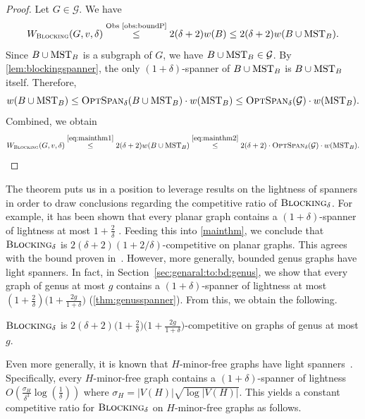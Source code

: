 \documentclass[a4paper,cleveref, autoref, thm-restate, thm-restate, UKenglish]{lipics-v2021}
\newcommand{\blocking}{\textsc{Blocking}}
\newcommand{\optspan}{\textsc{OptSpan}_\delta}
\newcommand{\cost}{W_{\blocking}}
\begin{document}
\begin{proof}
Let $G \in \mathcal{G}$. We have
\begin{equation}\label{eq:mainthm1}
\cost(G,v, \delta) \overset{\text{Obs \ref{obs:boundP}}}{\leq} 2(\delta+2) w(B)
\leq 2(\delta+2) w(B \cup \mstb).
\end{equation}
Since $B \cup \mathrm{MST}_B$ is a subgraph of $G$, we have $B \cup \mathrm{MST}_B \in \mathcal{G}$. By \cref{lem:blockingspanner}, the only $(1+\delta)$-spanner of $B\cup \mathrm{MST}_B$ is $B\cup \mathrm{MST}_B$ itself. Therefore, 
\begin{equation}\label{eq:mainthm2}
 w(B \cup \mstb) \leq  \optspan (B\cup \mstb) \cdot w(\mstb) \leq  \optspan (\mathcal{G}) \cdot w(\mstb).
 \end{equation} 
Combined, we obtain
\begin{equation*}
\cost(G,v, \delta) \overset{\eqref{eq:mainthm1}}{\leq} 2(\delta+2) w(B \cup \mstb) \overset{\eqref{eq:mainthm2}}{\leq} 2(\delta+2) \cdot \optspan (\mathcal{G}) \cdot w(\mstb). \qedhere
\end{equation*} 
\end{proof}

The theorem puts us in a position to leverage results on the lightness of spanners in order to draw conclusions regarding the competitive ratio of $\blocking_\delta$. 
For example, it has been shown that 
every planar graph contains a $(1+\delta)$-spanner of lightness at most $1+\frac{2}{\delta}$ \cite{althoefer}. 
Feeding this into \cref{mainthm}, we conclude that $\blocking_\delta$ is $2(\delta+2)(1+2/\delta)$-competitive on planar graphs. 
This agrees with the bound proven in~\cite{pruhs94}.
However, more generally, bounded genus graphs have light spanners. In fact, in Section~\ref{sec:genaral:to:bd:genus}, we show that every graph of genus at most $g$ contains a $(1+\delta)$-spanner of lightness at most $\left(1+\frac{2}{\delta} \right) \bigl( 1 + \frac{2g}{1+\delta}\bigl)$ (\cref{thm:genusspanner}). From this, we obtain the following.


\begin{corollary}\label{cor:blocking:delta:genus}
$\blocking_\delta$ is $2(\delta+2)\bigl(1+\frac{2}{\delta} \bigl) \bigl(1+\frac{2g}{1+\delta} \bigl)$-competitive on graphs of genus at most $g$.
\end{corollary}


Even more generally, it is known that $H$-minor-free graphs have light spanners~\cite{minorspanner}. Specifically, every $H$-minor-free graph contains a  $(1+\delta)$-spanner of lightness  $O\left( \frac{\sigma_H}{\delta^3} \log \left(\frac{1}{\delta} \right)\right)$ where $\sigma_H=|V(H)|\sqrt{\log |V(H)|}$. This yields a constant competitive ratio for $\blocking_\delta$ on $H$-minor-free graphs as follows.
 
\end{document}
